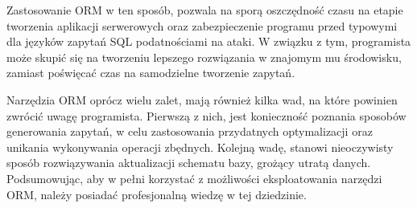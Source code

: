 Zastosowanie ORM w ten sposób, pozwala na sporą oszczędność czasu na etapie tworzenia aplikacji serwerowych oraz zabezpieczenie programu przed typowymi dla języków zapytań SQL podatnościami na ataki. W związku z tym, programista może skupić się na tworzeniu lepszego rozwiązania w znajomym mu środowisku, zamiast poświęcać czas na samodzielne tworzenie zapytań. 

Narzędzia ORM oprócz wielu zalet, mają również kilka wad, na które powinien zwrócić uwagę programista. Pierwszą z nich, jest konieczność poznania sposobów generowania zapytań, w celu zastosowania przydatnych optymalizacji oraz unikania wykonywania operacji zbędnych. Kolejną wadę, stanowi nieoczywisty sposób rozwiązywania aktualizacji schematu bazy, grożący utratą danych. Podsumowując, aby w pełni korzystać z  możliwości eksploatowania narzędzi ORM, należy posiadać profesjonalną wiedzę  w tej dziedzinie.